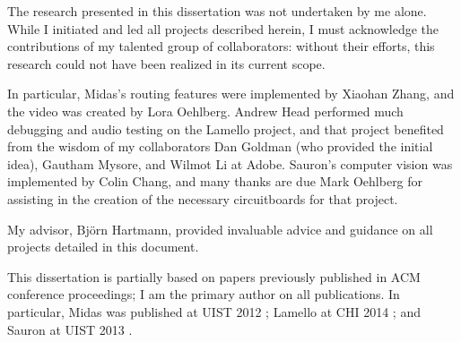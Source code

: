 The research presented in this dissertation was not undertaken by me alone. While I initiated
and led all projects described herein, I must acknowledge the contributions of my talented group of collaborators: without their efforts, this research could not have been realized in its current scope.

In particular, Midas's routing features were implemented by Xiaohan Zhang, and the video was created by Lora Oehlberg. Andrew Head performed much debugging and audio testing on the Lamello project, and that project benefited from the wisdom of my collaborators Dan Goldman (who provided the initial idea), Gautham Mysore, and Wilmot Li at Adobe. Sauron's computer vision was implemented by Colin Chang, and many thanks are due Mark Oehlberg for assisting in the creation of the necessary circuitboards for that project.

My advisor, Bj\"orn Hartmann, provided invaluable advice and guidance on all projects detailed in this document.

This dissertation is partially based on papers previously published in ACM conference proceedings; I am the primary author on all publications. In particular, Midas was published at UIST 2012 \cite{savage-midas}; Lamello at CHI 2014 \cite{savage-lamello}; and Sauron at UIST 2013 \cite{savage-sauron}.